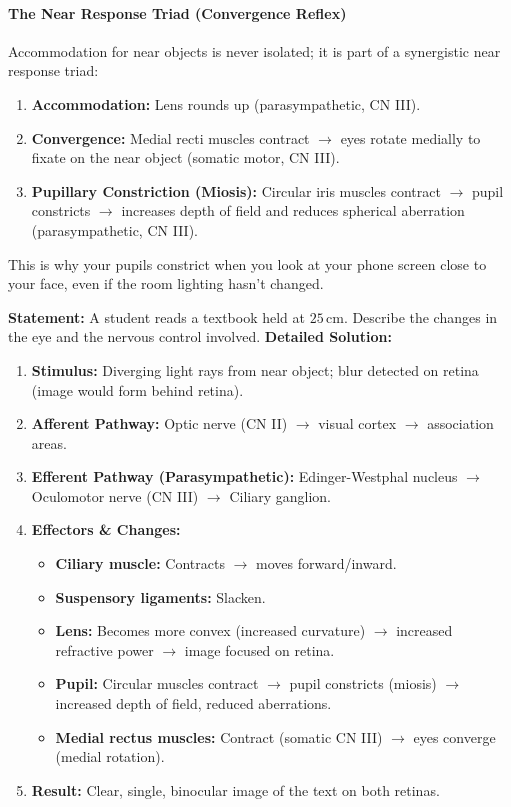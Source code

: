 \documentclass[11pt]{article}
\newcommand{\cle}[1]{{\popxbold\color{popdark}#1}}
\begin{document}
\paragraph{The Near Response Triad (Convergence Reflex)}
Accommodation for near objects is never isolated; it is part of a synergistic \cle{near response triad}:
\begin{enumerate}
    \item \textbf{Accommodation:} Lens rounds up (parasympathetic, CN III).
    \item \textbf{Convergence:} Medial recti muscles contract $\to$ eyes rotate medially to fixate on the near object (somatic motor, CN III).
    \item \textbf{Pupillary Constriction (Miosis):} Circular iris muscles contract $\to$ pupil constricts $\to$ increases depth of field and reduces spherical aberration (parasympathetic, CN III).
\end{enumerate}
This is why your pupils constrict when you look at your phone screen close to your face, even if the room lighting hasn't changed.

\begin{exoresolu}
\textbf{Statement:} A student reads a textbook held at $25\,\mathrm{cm}$. Describe the changes in the eye and the nervous control involved.
\tcblower
\textbf{Detailed Solution:}
\begin{enumerate}
    \item \textbf{Stimulus:} Diverging light rays from near object; blur detected on retina (image would form behind retina).
    \item \textbf{Afferent Pathway:} Optic nerve (CN II) $\to$ visual cortex $\to$ association areas.
    \item \textbf{Efferent Pathway (Parasympathetic):} Edinger-Westphal nucleus $\to$ Oculomotor nerve (CN III) $\to$ Ciliary ganglion.
    \item \textbf{Effectors \& Changes:}
        \begin{itemize}
            \item \textbf{Ciliary muscle:} Contracts $\to$ moves forward/inward.
            \item \textbf{Suspensory ligaments:} Slacken.
            \item \textbf{Lens:} Becomes more convex (increased curvature) $\to$ increased refractive power $\to$ image focused on retina.
            \item \textbf{Pupil:} Circular muscles contract $\to$ pupil constricts (miosis) $\to$ increased depth of field, reduced aberrations.
            \item \textbf{Medial rectus muscles:} Contract (somatic CN III) $\to$ eyes converge (medial rotation).
        \end{itemize}
    \item \textbf{Result:} Clear, single, binocular image of the text on both retinas.
\end{enumerate}
\end{exoresolu}
\end{document}
